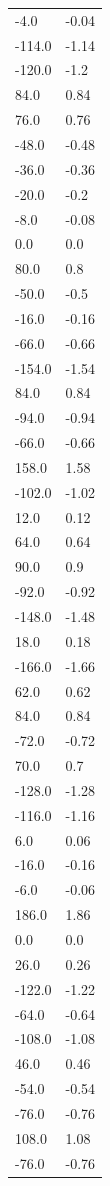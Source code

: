 \begin{longtable}{ll}
-4.0 & -0.04 \\
-114.0 & -1.14 \\
-120.0 & -1.2 \\
84.0 & 0.84 \\
76.0 & 0.76 \\
-48.0 & -0.48 \\
-36.0 & -0.36 \\
-20.0 & -0.2 \\
-8.0 & -0.08 \\
0.0 & 0.0 \\
80.0 & 0.8 \\
-50.0 & -0.5 \\
-16.0 & -0.16 \\
-66.0 & -0.66 \\
-154.0 & -1.54 \\
84.0 & 0.84 \\
-94.0 & -0.94 \\
-66.0 & -0.66 \\
158.0 & 1.58 \\
-102.0 & -1.02 \\
12.0 & 0.12 \\
64.0 & 0.64 \\
90.0 & 0.9 \\
-92.0 & -0.92 \\
-148.0 & -1.48 \\
18.0 & 0.18 \\
-166.0 & -1.66 \\
62.0 & 0.62 \\
84.0 & 0.84 \\
-72.0 & -0.72 \\
70.0 & 0.7 \\
-128.0 & -1.28 \\
-116.0 & -1.16 \\
6.0 & 0.06 \\
-16.0 & -0.16 \\
-6.0 & -0.06 \\
186.0 & 1.86 \\
0.0 & 0.0 \\
26.0 & 0.26 \\
-122.0 & -1.22 \\
-64.0 & -0.64 \\
-108.0 & -1.08 \\
46.0 & 0.46 \\
-54.0 & -0.54 \\
-76.0 & -0.76 \\
108.0 & 1.08 \\
-76.0 & -0.76 \\

\end{longtable}
